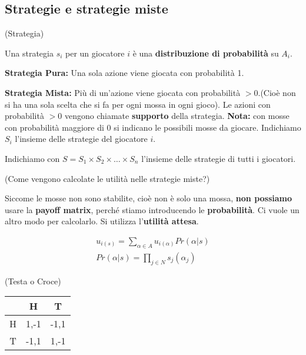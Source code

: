 \subsection{Strategie e strategie miste}

\begin{definition}(Strategia)
\end{definition}

Una strategia $s_i$ per un giocatore $i$ è una \textbf{distribuzione di
    probabilità} su $A_i$.

\textbf{Strategia Pura:} Una sola azione viene giocata con probabilità 1.

\textbf{Strategia Mista:} Più di un'azione viene giocata con probabilità $> 0$.(Cioè non si ha una sola scelta che si fa per ogni mossa in ogni gioco). Le azioni con probabilità $>0$ vengono chiamate \textbf{supporto} della strategia.
\textbf{Nota:} con mosse con probabilità maggiore di 0 si indicano le possibili mosse da giocare.
Indichiamo $S_i$ l'insieme delle strategie del giocatore $i$.

Indichiamo con $S = S_1 \times S_2 \times \dots \times S_n$ l'insieme delle
strategie di tutti i giocatori.

\begin{domanda}(Come vengono calcolate le utilità nelle strategie miste?)
\end{domanda}

Siccome le mosse non sono stabilite, cioè non è solo una mossa, \textbf{non
    possiamo} usare la \textbf{payoff matrix}, perché stiamo introducendo le
\textbf{probabilità}. Ci vuole un altro modo per calcolarlo. Si utilizza
l'\textbf{utilità attesa}.

\begin{equation}
    \begin{aligned}
        u_{i(s)}= \sum_{\alpha\in A} u_{i(\alpha)}Pr(\alpha|s) \\
        Pr(\alpha|s) = \prod_{j \in N} s_j(\alpha_j)
    \end{aligned}
\end{equation}

\begin{esempio}(Testa o Croce)

\end{esempio}

\begin{table}[H]
    \begin{center}
        \begin{tabular}{|c|c|c|}
            \hline
              & H    & T    \\
            \hline
            H & 1,-1 & -1,1 \\
            \hline
            T & -1,1 & 1,-1 \\
            \hline
        \end{tabular}
    \end{center}
\end{table}

